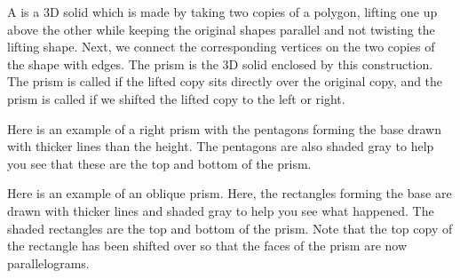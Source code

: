 \documentclass{ximera}
\begin{document}
\begin{definition}
A  is a 3D solid which is made by taking two copies of a polygon, lifting one up above the other while keeping the original shapes parallel and not twisting the lifting shape. Next, we connect the corresponding vertices on the two copies of the shape with edges. The prism is the 3D solid enclosed by this construction. The prism is called  if the lifted copy sits directly over the original copy, and the prism is called  if we shifted the lifted copy to the left or right.

Here is an example of a right prism with the pentagons forming the base drawn with thicker lines than the height. The pentagons are also shaded gray to help you see that these are the top and bottom of the prism.
\begin{image}
\end{image}

Here is an example of an oblique prism. Here, the rectangles forming the base are drawn with thicker lines and shaded gray to help you see what happened. The shaded rectangles are the top and bottom of the prism. Note that the top copy of the rectangle has been shifted over so that the faces of the prism are now parallelograms.
\begin{image}
\end{image}
\end{definition}
\end{document}
